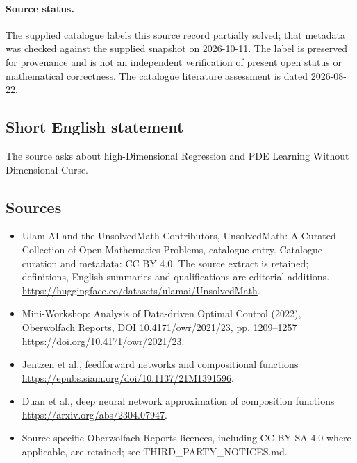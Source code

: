 \documentclass[11pt]{article}
\begin{document}
\paragraph{Source status.}
The supplied catalogue labels this source record partially solved; that metadata was checked against the supplied snapshot on 2026-10-11. The label is preserved for provenance and is not an independent verification of present open status or mathematical correctness. The catalogue literature assessment is dated 2026-08-22.
\subsection{Short English statement}
The source asks about high-Dimensional Regression and PDE Learning Without Dimensional Curse.
\subsection{Sources}
\begin{itemize}
\item[\hypertarget{source:statement:1}{S1}] Ulam AI and the UnsolvedMath Contributors, UnsolvedMath: A Curated Collection of Open Mathematics Problems, catalogue entry. Catalogue curation and metadata: CC BY 4.0. The source extract is retained; definitions, English summaries and qualifications are editorial additions.
\url{https://huggingface.co/datasets/ulamai/UnsolvedMath}.
\item[\hypertarget{source:statement:2}{S2}] Mini-Workshop: Analysis of Data-driven Optimal Control (2022), Oberwolfach Reports, DOI 10.4171/owr/2021/23, pp. 1209--1257
\url{https://doi.org/10.4171/owr/2021/23}.
\item[\hypertarget{source:statement:3}{S3}] Jentzen et al., feedforward networks and compositional functions
\url{https://epubs.siam.org/doi/10.1137/21M1391596}.
\item[\hypertarget{source:statement:4}{S4}] Duan et al., deep neural network approximation of composition functions
\url{https://arxiv.org/abs/2304.07947}.
\item Source-specific Oberwolfach Reports licences, including CC BY-SA 4.0 where applicable, are retained; see THIRD\_PARTY\_NOTICES.md.
\end{itemize}
\end{document}
